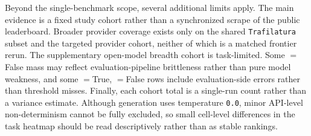 Beyond the single-benchmark scope, several additional limits apply. The main
evidence is a fixed study cohort rather than a synchronized scrape of the
public \gittaskbench leaderboard. Broader provider coverage exists only on the
shared \texttt{Trafilatura} subset and the targeted provider cohort, neither of
which is a matched frontier rerun. The supplementary open-model breadth cohort
is task-limited. Some \processmetric$=$False mass may reflect
evaluation-pipeline brittleness rather than pure model weakness, and some
\processmetric$=$True, \resultmetric$=$False rows include evaluation-side
errors rather than threshold misses. Finally, each cohort total is a single-run
count rather than a variance estimate. Although generation uses temperature
\texttt{0.0}, minor API-level non-determinism cannot be fully excluded, so
small cell-level differences in the task heatmap should be read descriptively
rather than as stable rankings.
